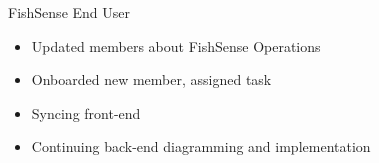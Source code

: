 
\begin{frame}{FishSense End User}
    \begin{itemize}
        \item Updated members about FishSense Operations
        \item Onboarded new member, assigned task
        \item Syncing front-end
        \item Continuing back-end diagramming and implementation
    \end{itemize}    
\end{frame}



